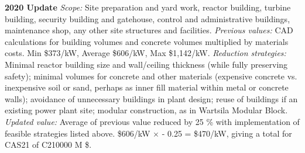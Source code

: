 \textbf{2020 Update}
\emph{Scope: }
Site preparation and yard work, reactor building, turbine building, security building and gatehouse, control and administrative buildings, maintenance shop, any other site structures and facilities.
\emph{Previous values:} CAD calculations for building volumes and concrete volumes multiplied by materials costs.
Min \$373/kW, Average \$606/kW, Max \$1,142/kW.
\emph{Reduction strategies: }
Minimal reactor building size and wall/ceiling thickness (while fully preserving safety); minimal volumes for concrete and other materials (expensive concrete vs. inexpensive soil or sand, perhaps as inner fill material within metal or concrete walls); avoidance of unnecessary buildings in plant design; reuse of buildings if an existing power plant site; modular construction, as in Wartsila Modular Block.
\emph{Updated value: }
Average of previous value reduced by 25 \% with implementation of feasible strategies listed above. \$606/kW $\times$ - 0.25 = \$470/kW, giving a total for CAS21 of C210000 M \$.

